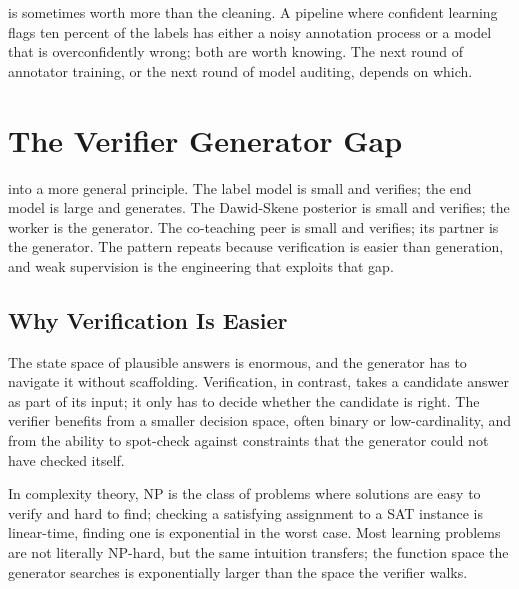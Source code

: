  is sometimes worth more than the cleaning. A pipeline where confident learning flags ten percent of the labels has either a noisy annotation process or a model that is overconfidently wrong; both are worth knowing. The next round of annotator training, or the next round of model auditing, depends on which.


\newpage
\section{The Verifier Generator Gap}


 into a more general principle. The label model is small and verifies; the end model is large and generates. The Dawid-Skene posterior is small and verifies; the worker is the generator. The co-teaching peer is small and verifies; its partner is the generator. The pattern repeats because verification is easier than generation, and weak supervision is the engineering that exploits that gap.

\subsection{Why Verification Is Easier}

 The state space of plausible answers is enormous, and the generator has to navigate it without scaffolding. Verification, in contrast, takes a candidate answer as part of its input; it only has to decide whether the candidate is right. The verifier benefits from a smaller decision space, often binary or low-cardinality, and from the ability to spot-check against constraints that the generator could not have checked itself.

 In complexity theory, $\mathrm{NP}$ is the class of problems where solutions are easy to verify and hard to find; checking a satisfying assignment to a SAT instance is linear-time, finding one is exponential in the worst case. Most learning problems are not literally NP-hard, but the same intuition transfers; the function space the generator searches is exponentially larger than the space the verifier walks.

